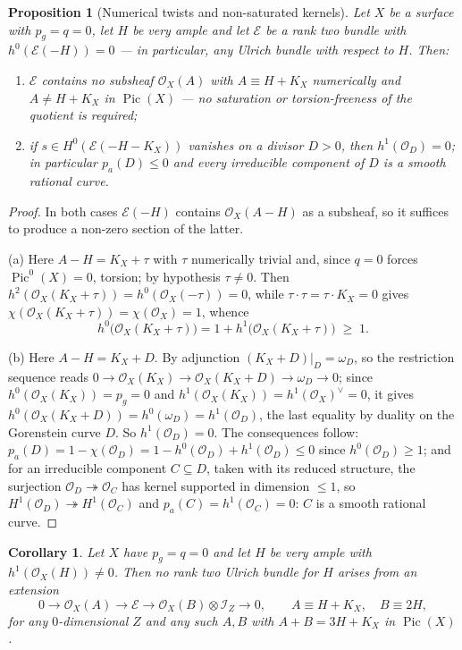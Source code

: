\documentclass[10pt,a4paper]{amsart}
\newtheorem{proposition}[theorem]{Proposition}
\newtheorem{corollary}[theorem]{Corollary}
\newcommand{\OO}{\mathcal{O}}
\newcommand{\EE}{\mathcal{E}}
\newcommand{\II}{\mathcal{I}}
\newcommand{\Pic}{\operatorname{Pic}}
\begin{document}
\begin{proposition}[Numerical twists and non-saturated kernels]\label{prop:numkernel}
Let $X$ be a surface with $p_g=q=0$, let $H$ be very ample and let $\EE$ be a rank two bundle with $h^0(\EE(-H))=0$ --- in particular, any Ulrich bundle with respect to $H$. Then:
\begin{enumerate}[label=\textup{(\alph*)}]
\item $\EE$ contains no subsheaf $\OO_X(A)$ with $A\equiv H+K_X$ numerically and $A\neq H+K_X$ in $\Pic(X)$ --- no saturation or torsion-freeness of the quotient is required;
\item if $s\in H^0(\EE(-H-K_X))$ vanishes on a divisor $D>0$, then $h^1(\OO_D)=0$; in particular $p_a(D)\le0$ and every irreducible component of $D$ is a smooth rational curve.
\end{enumerate}
\end{proposition}

\begin{proof}
In both cases $\EE(-H)$ contains $\OO_X(A-H)$ as a subsheaf, so it suffices to produce a non-zero section of the latter.

(a) Here $A-H=K_X+\tau$ with $\tau$ numerically trivial and, since $q=0$ forces $\Pic^0(X)=0$, torsion; by hypothesis $\tau\neq0$. Then $h^2(\OO_X(K_X+\tau))=h^0(\OO_X(-\tau))=0$, while $\tau\cdot\tau=\tau\cdot K_X=0$ gives $\chi(\OO_X(K_X+\tau))=\chi(\OO_X)=1$, whence
\[
h^0\bigl(\OO_X(K_X+\tau)\bigr)=1+h^1\bigl(\OO_X(K_X+\tau)\bigr)\;\ge\;1 .
\]

(b) Here $A-H=K_X+D$. By adjunction $(K_X+D)|_D=\omega_D$, so the restriction sequence reads $0\to\OO_X(K_X)\to\OO_X(K_X+D)\to\omega_D\to0$; since $h^0(\OO_X(K_X))=p_g=0$ and $h^1(\OO_X(K_X))=h^1(\OO_X)^\vee=0$, it gives $h^0(\OO_X(K_X+D))=h^0(\omega_D)=h^1(\OO_D)$, the last equality by duality on the Gorenstein curve $D$. So $h^1(\OO_D)=0$. The consequences follow: $p_a(D)=1-\chi(\OO_D)=1-h^0(\OO_D)+h^1(\OO_D)\le0$ since $h^0(\OO_D)\ge1$; and for an irreducible component $C\subseteq D$, taken with its reduced structure, the surjection $\OO_D\twoheadrightarrow\OO_C$ has kernel supported in dimension $\le1$, so $H^1(\OO_D)\twoheadrightarrow H^1(\OO_C)$ and $p_a(C)=h^1(\OO_C)=0$: $C$ is a smooth rational curve.
\end{proof}

\begin{corollary}\label{cor:numerical-nogo}
Let $X$ have $p_g=q=0$ and let $H$ be very ample with $h^1(\OO_X(H))\neq0$. Then no rank two Ulrich bundle for $H$ arises from an extension
\[
0\longrightarrow\OO_X(A)\longrightarrow\EE\longrightarrow\OO_X(B)\otimes\II_Z\longrightarrow0,\qquad A\equiv H+K_X,\quad B\equiv 2H ,
\]
for any $0$-dimensional $Z$ and any such $A,B$ with $A+B=3H+K_X$ in $\Pic(X)$.
\end{corollary}
\end{document}

